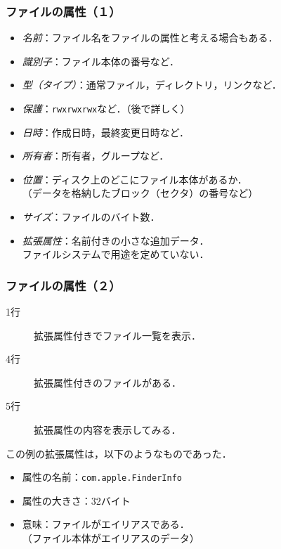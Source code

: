 \documentclass[unicode,handout]{beamer}                   %
\begin{document}
\begin{frame}
  \frametitle{ファイルの属性（１）}
  \begin{itemize}
  \item \emph{名前}：ファイル名をファイルの属性と考える場合もある．
  \item \emph{識別子}：ファイル本体の番号など．
  \item \emph{型（タイプ）}：通常ファイル，ディレクトリ，リンクなど．
  \item \emph{保護}：\texttt{rwxrwxrwx}など．（後で詳しく）
  \item \emph{日時}：作成日時，最終変更日時など．
  \item \emph{所有者}：所有者，グループなど．
  \item \emph{位置}：ディスク上のどこにファイル本体があるか．\\
    （データを格納したブロック（セクタ）の番号など）
  \item \emph{サイズ}：ファイルのバイト数．
  \item \emph{拡張属性}：名前付きの小さな追加データ．\\
    ファイルシステムで用途を定めていない．
  \end{itemize}
\end{frame}

\begin{frame}
  \frametitle{ファイルの属性（２）}
  \vspace{-0.2cm}
  \begin{minipage}{0.71\columnwidth}
  \begin{description}
  \item[1行] 拡張属性付きでファイル一覧を表示．
  \item[4行] 拡張属性付きのファイルがある．
  \item[5行] 拡張属性の内容を表示してみる．
  \end{description}
  この例の拡張属性は，以下のようなものであった．
  \begin{itemize}
  \item 属性の名前：\texttt{com.apple.FinderInfo}
  \item 属性の大きさ：32バイト
  \item 意味：ファイルがエイリアスである．\\
    （ファイル本体がエイリアスのデータ）
  \end{itemize}
  \end{minipage}
  \begin{minipage}{0.27\columnwidth}
  \end{minipage}
\end{frame}
\end{document}
